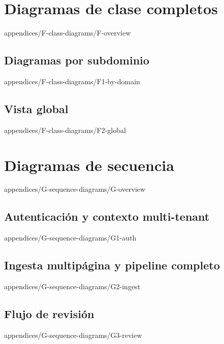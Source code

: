 \documentclass[epsbased,tfg,covers,final,printable,extendedindex,%
               firstnumbered,lof,lot, loc]{tfgtfmthesisuam}
\begin{document}
\chapter{Diagramas de clase completos\label{AP:CLASS-DIAGRAMS}}%
        {appendices/F-class-diagrams/F-overview}
  \section{Diagramas por subdominio\label{SEC:CLASS-BY-DOMAIN}}%
          {appendices/F-class-diagrams/F1-by-domain}
  \section{Vista global\label{SEC:CLASS-GLOBAL}}%
          {appendices/F-class-diagrams/F2-global}

\chapter{Diagramas de secuencia\label{AP:SEQUENCE}}%
        {appendices/G-sequence-diagrams/G-overview}
  \section{Autenticación y contexto multi-tenant%
           \label{SEC:SEQ-AUTH}}%
          {appendices/G-sequence-diagrams/G1-auth}
  \section{Ingesta multipágina y pipeline completo%
           \label{SEC:SEQ-INGEST}}%
          {appendices/G-sequence-diagrams/G2-ingest}
  \section{Flujo de revisión%
           \label{SEC:SEQ-REVIEW}}%
          {appendices/G-sequence-diagrams/G3-review}
\end{document}
